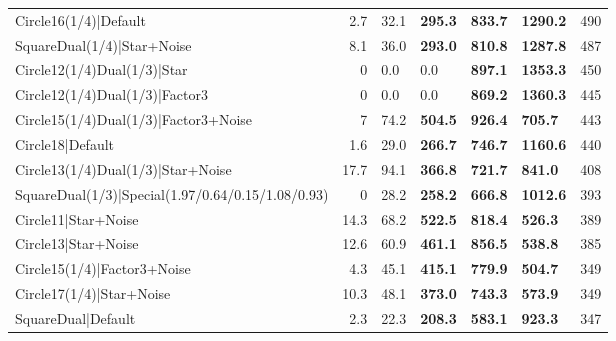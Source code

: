 \begin{tabular}{lrllllr}
 Circle16(1/4)|Default                                          &          2.7 & 32.1           & \textbf{295.3}  & \textbf{833.7}  & \textbf{1290.2} &          490 \\
 SquareDual(1/4)|Star+Noise                                     &          8.1 & 36.0           & \textbf{293.0}  & \textbf{810.8}  & \textbf{1287.8} &          487 \\
 Circle12(1/4)Dual(1/3)|Star                                    &          0   & 0.0            & 0.0             & \textbf{897.1}  & \textbf{1353.3} &          450 \\
 Circle12(1/4)Dual(1/3)|Factor3                                 &          0   & 0.0            & 0.0             & \textbf{869.2}  & \textbf{1360.3} &          445 \\
 Circle15(1/4)Dual(1/3)|Factor3+Noise                           &          7   & 74.2           & \textbf{504.5}  & \textbf{926.4}  & \textbf{705.7}  &          443 \\
 Circle18|Default                                               &          1.6 & 29.0           & \textbf{266.7}  & \textbf{746.7}  & \textbf{1160.6} &          440 \\
 Circle13(1/4)Dual(1/3)|Star+Noise                              &         17.7 & 94.1           & \textbf{366.8}  & \textbf{721.7}  & \textbf{841.0}  &          408 \\
 SquareDual(1/3)|Special(1.97/0.64/0.15/1.08/0.93)              &          0   & 28.2           & \textbf{258.2}  & \textbf{666.8}  & \textbf{1012.6} &          393 \\
 Circle11|Star+Noise                                            &         14.3 & 68.2           & \textbf{522.5}  & \textbf{818.4}  & \textbf{526.3}  &          389 \\
 Circle13|Star+Noise                                            &         12.6 & 60.9           & \textbf{461.1}  & \textbf{856.5}  & \textbf{538.8}  &          385 \\
 Circle15(1/4)|Factor3+Noise                                    &          4.3 & 45.1           & \textbf{415.1}  & \textbf{779.9}  & \textbf{504.7}  &          349 \\
 Circle17(1/4)|Star+Noise                                       &         10.3 & 48.1           & \textbf{373.0}  & \textbf{743.3}  & \textbf{573.9}  &          349 \\
 SquareDual|Default                                             &          2.3 & 22.3           & \textbf{208.3}  & \textbf{583.1}  & \textbf{923.3}  &          347 \\

\end{tabular}

